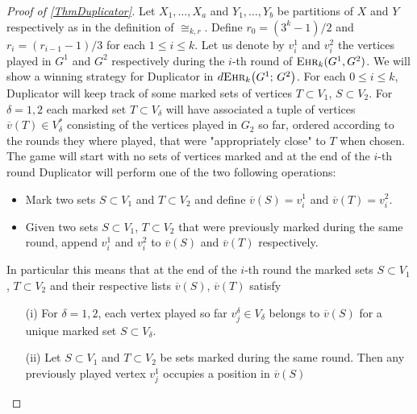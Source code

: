 \documentclass[12pt,notitlepage,a4paper]{article}
\theoremstyle{definition}
\newcommand{\ehr}{\textsc{Ehr}}
\begin{document}
\begin{proof}[Proof of \cref{ThmDuplicator}]
	Let $X_1,\dots,X_a$ and 
	$Y_1,\dots,Y_b$ be partitions of 
	$X$ and $Y$ respectively
	as in the definition of $\cong_{k,r}$.
	Define $r_0=(3^k-1)/2$ and $r_i=(r_{i-1}-1)/3$ for each
	$1\leq i \leq k$. 
	Let us denote by $v^1_i$ and $v^2_i$ the vertices played
	in $G^1$ and $G^2$ respectively during the $i$-th
	round of $\ehr_k(G^1,G^2)$. 
	We will show a winning strategy for Duplicator
	in $d\ehr_{k}\big(G^1;\, G^2\big)$. For each $0\leq i \leq k$,
	Duplicator will	keep track of some marked sets 
	of vertices $T\subset V_1$, $S\subset V_2$. 
	For $\delta=1,2$ each marked set
	$T\subset V_\delta$ will have associated a tuple
	of vertices $\overline{v}(T)\in V_\delta^*$ consisting
	of the vertices played in $G_2$ so far, ordered according
	to the rounds they where played, that were 
	"appropriately close" to $T$ when chosen.
	The game will start with no sets of vertices marked and 
	at the end of the $i$-th
	round Duplicator will perform one of the two
	following operations:
	\begin{itemize}
	\item Mark two sets $S\subset V_1$ and $T\subset V_2$ and
	define $\overline{v}(S)=v^1_i$ and $\overline{v}(T)=v^2_i$.
	\item Given two sets $S\subset V_1$, $T\subset V_2$ that were 
	previously marked during the same round, append $v^1_i$
	and $v^2_i$ to $\overline{v}(S)$ and $\overline{v}(T)$ 
	respectively. 
	\end{itemize}
	In particular this means that at the 
	end of the $i$-th round the marked sets $S\subset V_1$
	, $T\subset V_2$ and their respective lists $\overline{v}(S)$,
	$\overline{v}(T)$ satisfy
	\begin{itemize}
		\item[(i)] For $\delta=1,2$, each vertex played
		so far $v^\delta_j\in V_\delta$ belongs to 
		$\overline{v}(S)$ for a	 unique marked set 
		$S\subset V_\delta$.
		\item[(ii)] Let $S\subset V_1$ and $T\subset V_2$ be sets
		marked during the same round. Then any previously played
		vertex $v^1_j$ occupies a position in $\overline{v}(S)$

\end{itemize}
\end{proof}
\end{document}
